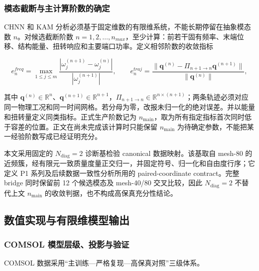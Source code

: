 \subsubsection{模态截断与主计算阶数的确定}\label{sec:galerkin-2-10-3}

CHNN 和 KAM 分析必须基于固定维数的有限维系统，不能长期停留在抽象模态数 \(n\)。对候选截断阶数 \(n = 1,2,\ldots,n_{max}\)，至少计算：前若干固有频率、末端位移、结构能量、扭转响应和主要端口功率。定义相邻阶数的收敛指标

\begin{equation}
\label{eq:galerkin-2-115}
e_{n}^{freq} = \max_{1 \leq j \leq m}\frac{\left| \omega_{j}^{(n + 1)} - \omega_{j}^{(n)} \right|}{\left| \omega_{j}^{(n + 1)} \right|},\quad\quad e_{n}^{traj} = \frac{\parallel \mathbf{q}^{(n)} - \Pi_{n + 1 \rightarrow n}\mathbf{q}^{(n + 1)} \parallel}{\parallel \mathbf{q}^{(n)} \parallel},
\end{equation}

其中 \(\mathbf{q}^{(n)}\in\mathbb{R}^{n}\)、\(\mathbf{q}^{(n+1)}\in\mathbb{R}^{n+1}\)，\(\Pi_{n+1\rightarrow n}\in\mathbb{R}^{n\times(n+1)}\)；两条轨迹必须对应同一物理工况和同一时间网格。若分母为零，改报未归一化的绝对误差。并以能量和扭转量定义同类指标。正式生产阶数记为 \(n_{\mathrm{main}}\)，取为所有指定指标首次同时低于容差的位置。正文在尚未完成该计算时只能保留 \(n_{\mathrm{main}}\) 为待确定参数，不能把某一经验阶数写成已经证明充分。

本文采用固定的 \(N_{\mathrm{diag}}=2\) 诊断基检验 canonical 数据映射。该基取自 mesh-80 的近频簇，经有限元一致质量度量正交归一，并固定符号、归一化和自由度行序；它定义 P1 系列及后续数据一致性分析所用的 paired-coordinate contract。完整 bridge 同时保留前 12 个候选模态及 mesh-40/80 交叉比较，因此 \(N_{\mathrm{diag}}=2\) 不替代上文 \(n_{\mathrm{main}}\) 的收敛判据，也不构成高保真充分性结论。

\subsection{数值实现与有限维模型输出}\label{sec:galerkin-2-11}

\subsubsection{COMSOL 模型层级、投影与验证}\label{sec:galerkin-2-11-1}

COMSOL 数据采用``主训练---严格复现---高保真对照''三级体系。


